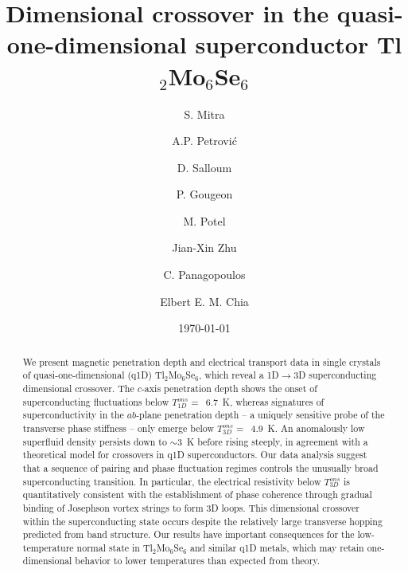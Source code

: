 \documentclass[prb,twocolumn,showpacs,preprintnumbers,amsmath,amssymb,floatfix,groupedaddress,superscriptaddress,aps,10pt]{revtex4-1}
\begin{document}
\title{Dimensional crossover in the quasi-one-dimensional superconductor Tl$_2$Mo$_6$Se$_6$}

\author{S. Mitra}
\author{A.P. Petrovi\'c}
\author{D. Salloum}
\author{P. Gougeon}
\author{M. Potel}
\author{Jian-Xin Zhu}
\author{C. Panagopoulos}
\author{Elbert E. M. Chia}
\date{\today}

\begin{abstract}
We present magnetic penetration depth and electrical transport data in single crystals of quasi-one-dimensional (q1D) Tl$_2$Mo$_6$Se$_6$, which reveal a 1D$\rightarrow$3D superconducting dimensional crossover.  The $c$-axis penetration depth shows the onset of superconducting fluctuations below $T_{1D}^{ons}=$~6.7~K, whereas signatures of superconductivity in the $ab$-plane penetration depth -- a uniquely sensitive probe of the transverse phase stiffness -- only emerge below $T_{3D}^{ons}=$~4.9~K. An anomalously low superfluid density persists down to $\sim$3~K before rising steeply, in agreement with a theoretical model for crossovers in q1D superconductors. Our data analysis suggest that a sequence of pairing and phase fluctuation regimes controls the unusually broad superconducting transition.  In particular, the electrical resistivity below $T_{3D}^{ons}$ is quantitatively consistent with the establishment of phase coherence through gradual binding of Josephson vortex strings to form 3D loops. This dimensional crossover within the superconducting state occurs despite the relatively large transverse hopping predicted from band structure. Our results have important consequences for the low-temperature normal state in Tl$_2$Mo$_6$Se$_6$ and similar q1D metals, which may retain one-dimensional behavior to lower temperatures than expected from theory.  
	
\end{abstract}
\end{document}
